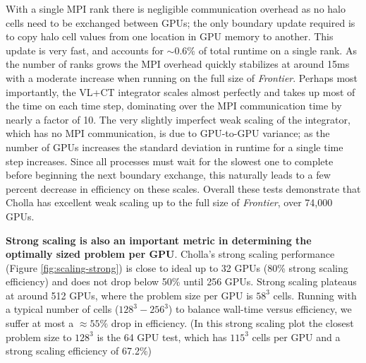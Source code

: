 \documentclass[modern]{aastex631}
\begin{document}
With a single MPI rank there is negligible communication overhead as no halo cells need to be exchanged between GPUs; the only boundary update required is to copy halo cell values from one location in GPU memory to another. This update is very fast, and accounts for $\sim 0.6\%$ of total runtime on a single rank. As the number of ranks grows the MPI overhead quickly stabilizes at around 15ms with a moderate increase when running on the full size of \textit{Frontier}. Perhaps most importantly, the VL+CT integrator scales almost perfectly and takes up most of the time on each time step, dominating over the MPI communication time by nearly a factor of 10. The very slightly imperfect weak scaling of the integrator, which has no MPI communication, is due to GPU-to-GPU variance; as the number of GPUs increases the standard deviation in runtime for a single time step increases. Since all processes must wait for the slowest one to complete before beginning the next boundary exchange, this naturally leads to a few percent decrease in efficiency on these scales. Overall these tests demonstrate that Cholla has excellent weak scaling up to the full size of \textit{Frontier}, over 74,000 GPUs.

\textbf{Strong scaling is also an important metric in determining the optimally sized problem per GPU}. Cholla's strong scaling performance (Figure \ref{fig:scaling-strong}) is close to ideal up to 32 GPUs (80\% strong scaling efficiency) and does not drop below 50\% until 256 GPUs. Strong scaling plateaus at around 512 GPUs, where the problem size per GPU is $58^3$ cells. Running with a typical number of cells ($128^3 - 256^3$) to balance wall-time versus efficiency, we suffer at most a $\approx55\%$ drop in efficiency. (In this strong scaling plot the closest problem size to $128^3$ is the 64 GPU test, which has $115^3$ cells per GPU and a strong scaling efficiency of 67.2\%)

\end{document}
